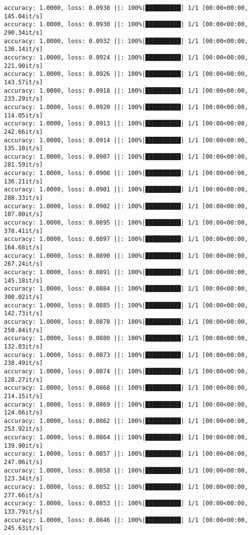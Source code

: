 \documentclass[
]{article}
\begin{document}
\begin{verbatim}
accuracy: 1.0000, loss: 0.0938 ||: 100%|██████████| 1/1 [00:00<00:00, 145.04it/s]
accuracy: 1.0000, loss: 0.0930 ||: 100%|██████████| 1/1 [00:00<00:00, 290.34it/s]
accuracy: 1.0000, loss: 0.0932 ||: 100%|██████████| 1/1 [00:00<00:00, 136.14it/s]
accuracy: 1.0000, loss: 0.0924 ||: 100%|██████████| 1/1 [00:00<00:00, 221.90it/s]
accuracy: 1.0000, loss: 0.0926 ||: 100%|██████████| 1/1 [00:00<00:00, 143.57it/s]
accuracy: 1.0000, loss: 0.0918 ||: 100%|██████████| 1/1 [00:00<00:00, 233.29it/s]
accuracy: 1.0000, loss: 0.0920 ||: 100%|██████████| 1/1 [00:00<00:00, 114.05it/s]
accuracy: 1.0000, loss: 0.0913 ||: 100%|██████████| 1/1 [00:00<00:00, 242.66it/s]
accuracy: 1.0000, loss: 0.0914 ||: 100%|██████████| 1/1 [00:00<00:00, 135.10it/s]
accuracy: 1.0000, loss: 0.0907 ||: 100%|██████████| 1/1 [00:00<00:00, 281.59it/s]
accuracy: 1.0000, loss: 0.0908 ||: 100%|██████████| 1/1 [00:00<00:00, 136.21it/s]
accuracy: 1.0000, loss: 0.0901 ||: 100%|██████████| 1/1 [00:00<00:00, 288.33it/s]
accuracy: 1.0000, loss: 0.0902 ||: 100%|██████████| 1/1 [00:00<00:00, 107.80it/s]
accuracy: 1.0000, loss: 0.0895 ||: 100%|██████████| 1/1 [00:00<00:00, 378.41it/s]
accuracy: 1.0000, loss: 0.0897 ||: 100%|██████████| 1/1 [00:00<00:00, 164.68it/s]
accuracy: 1.0000, loss: 0.0890 ||: 100%|██████████| 1/1 [00:00<00:00, 267.24it/s]
accuracy: 1.0000, loss: 0.0891 ||: 100%|██████████| 1/1 [00:00<00:00, 145.18it/s]
accuracy: 1.0000, loss: 0.0884 ||: 100%|██████████| 1/1 [00:00<00:00, 300.02it/s]
accuracy: 1.0000, loss: 0.0885 ||: 100%|██████████| 1/1 [00:00<00:00, 142.73it/s]
accuracy: 1.0000, loss: 0.0878 ||: 100%|██████████| 1/1 [00:00<00:00, 250.84it/s]
accuracy: 1.0000, loss: 0.0880 ||: 100%|██████████| 1/1 [00:00<00:00, 132.03it/s]
accuracy: 1.0000, loss: 0.0873 ||: 100%|██████████| 1/1 [00:00<00:00, 238.49it/s]
accuracy: 1.0000, loss: 0.0874 ||: 100%|██████████| 1/1 [00:00<00:00, 128.27it/s]
accuracy: 1.0000, loss: 0.0868 ||: 100%|██████████| 1/1 [00:00<00:00, 214.15it/s]
accuracy: 1.0000, loss: 0.0869 ||: 100%|██████████| 1/1 [00:00<00:00, 124.66it/s]
accuracy: 1.0000, loss: 0.0862 ||: 100%|██████████| 1/1 [00:00<00:00, 253.92it/s]
accuracy: 1.0000, loss: 0.0864 ||: 100%|██████████| 1/1 [00:00<00:00, 139.90it/s]
accuracy: 1.0000, loss: 0.0857 ||: 100%|██████████| 1/1 [00:00<00:00, 247.06it/s]
accuracy: 1.0000, loss: 0.0858 ||: 100%|██████████| 1/1 [00:00<00:00, 123.34it/s]
accuracy: 1.0000, loss: 0.0852 ||: 100%|██████████| 1/1 [00:00<00:00, 277.66it/s]
accuracy: 1.0000, loss: 0.0853 ||: 100%|██████████| 1/1 [00:00<00:00, 133.79it/s]
accuracy: 1.0000, loss: 0.0846 ||: 100%|██████████| 1/1 [00:00<00:00, 245.63it/s]

\end{verbatim}
\end{document}
